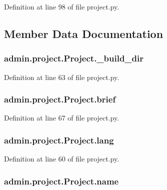 Definition at line 98 of file project.\-py.



\subsection{Member Data Documentation}
\hypertarget{classadmin_1_1project_1_1Project_a9357a34aaccfd3fc391b4081f6794ee8}{
\subsubsection[{\-\_\-build\-\_\-dir}]{\setlength{\rightskip}{0pt plus 5cm}admin.\-project.\-Project.\-\_\-build\-\_\-dir\hspace{0.3cm}{\ttfamily [private]}}}\label{classadmin_1_1project_1_1Project_a9357a34aaccfd3fc391b4081f6794ee8}


Definition at line 63 of file project.\-py.

\hypertarget{classadmin_1_1project_1_1Project_ac3e2b73e80631fe2171b8d4b236f2e53}{
\subsubsection[{brief}]{\setlength{\rightskip}{0pt plus 5cm}admin.\-project.\-Project.\-brief}}\label{classadmin_1_1project_1_1Project_ac3e2b73e80631fe2171b8d4b236f2e53}


Definition at line 67 of file project.\-py.

\hypertarget{classadmin_1_1project_1_1Project_add0eb047a815df47b9b888aa8a028b77}{
\subsubsection[{lang}]{\setlength{\rightskip}{0pt plus 5cm}admin.\-project.\-Project.\-lang}}\label{classadmin_1_1project_1_1Project_add0eb047a815df47b9b888aa8a028b77}


Definition at line 60 of file project.\-py.

\hypertarget{classadmin_1_1project_1_1Project_a9b8c34b91f1ecdbbdcfea42e771dd6d6}{
\subsubsection[{name}]{\setlength{\rightskip}{0pt plus 5cm}admin.\-project.\-Project.\-name}}\label{classadmin_1_1project_1_1Project_a9b8c34b91f1ecdbbdcfea42e771dd6d6}


